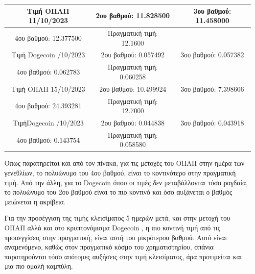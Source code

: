 \documentclass[a4paper,11pt]{article}
\newcommand{\lt}{\latintext}
\newcommand{\gt}{\greektext}
\begin{document}
\begin{center}
    

    \begin{tabular}{ |c|c|c| }

        \hline
        Τιμή ΟΠΑΠ 11/10/2023 & 2ου βαθμού: 11.828500 &
        3ου βαθμού: 11.458000  \\
        \hline
        4ου βαθμού: 12.377500  & Πραγματική τιμή: 12.1600  & \\
         \hline
        Τιμή \lt Dogecoin \gt 11/10/2023 &2ου βαθμού: 0.057492 &
         3ου βαθμού: 0.057382 \\
        \hline
        4ου βαθμού: 0.062783  & Πραγματική τιμή: 0.060258 & \\
         \hline
        \hline
        Τιμή ΟΠΑΠ 15/10/2023 & 2ου βαθμού: 10.499924 & 
        3ου βαθμού: 7.398606 \\
        \hline
        4ου βαθμού: 24.393281 & Πραγματική τιμή: 12.7000 & \\
         \hline
        Τιμή\lt Dogecoin \gt 15/10/2023 & 2ου βαθμού: 0.044838 &
        3ου βαθμού: 0.043918  \\
        \hline
        4ου βαθμού: 0.143754 & Πραγματική τιμή: 0.058580 & \\
         \hline
    
    \end{tabular}
   
\end{center}

Όπως παρατηρείται και από τον πίνακα, για τις μετοχές του ΟΠΑΠ στην ημέρα των γενεθλίων, το πολυώνυμο του 4ου βαθμού, είναι το κοντινότερο στην πραγματική τιμή. Από την άλλη, για το  \lt Dogecoin \gt όπου οι τιμές δεν μεταβάλλονται τόσο ραγδαία, το πολυώνυμο του 2ου βαθμού είναι το πιο κοντινό και όσο αυξάνεται ο βαθμός μειώνεται η ακρίβεια. \par 
 Για την προσέγγιση της τιμής κλεισίματος 5 ημερών μετά, και στην μετοχή του ΟΠΑΠ αλλά και στο κρυπτονόμισμα \lt Dogecoin \gt, η πιο κοντινή τιμή από τις προσεγγίσεις στην πραγματική, είναι  αυτή του μικρότερου βαθμού. Αυτό είναι αναμενόμενο, καθώς στον πραγματικό κόσμο του χρηματιστηρίου, σπάνια παρατηρούνται τόσο απότομες αυξήσεις στην τιμή κλεισίματος, άρα προτιμείται και μια πιο ομαλή καμπύλη. 

\end{document}

